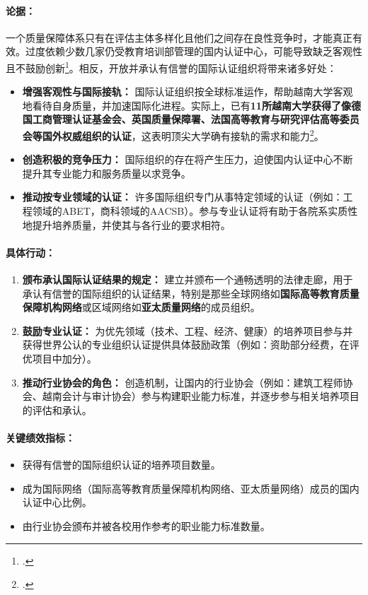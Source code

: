 \paragraph{论据：}
一个质量保障体系只有在评估主体多样化且他们之间存在良性竞争时，才能真正有效。过度依赖少数几家仍受教育培训部管理的国内认证中心，可能导致缺乏客观性且不鼓励创新\footcite{giaoducnet_kdcl_list_2023}。相反，开放并承认有信誉的国际认证组织将带来诸多好处：
\begin{itemize}
    \item \textbf{增强客观性与国际接轨：} 国际认证组织按全球标准运作，帮助越南大学客观地看待自身质量，并加速国际化进程。实际上，已有\textbf{11所越南大学获得了像德国工商管理认证基金会、英国质量保障署、法国高等教育与研究评估高等委员会等国外权威组织的认证}，这表明顶尖大学确有接轨的需求和能力\footcite{thuvienphapluat_11truong_quocte}。
    \item \textbf{创造积极的竞争压力：} 国际组织的存在将产生压力，迫使国内认证中心不断提升其专业能力和服务质量以求竞争。
    \item \textbf{推动按专业领域的认证：} 许多国际组织专门从事特定领域的认证（例如：工程领域的ABET，商科领域的AACSB）。参与专业认证将有助于各院系实质性地提升培养质量，并使其与各行业的要求相符。
\end{itemize}

\paragraph{具体行动：}
\begin{enumerate}
    \item \textbf{颁布承认国际认证结果的规定：} 建立并颁布一个通畅透明的法律走廊，用于承认有信誉的国际组织的认证结果，特别是那些全球网络如\textbf{国际高等教育质量保障机构网络}或区域网络如\textbf{亚太质量网络}的成员组织。
    \item \textbf{鼓励专业认证：} 为优先领域（技术、工程、经济、健康）的培养项目参与并获得世界公认的专业组织认证提供具体鼓励政策（例如：资助部分经费，在评优项目中加分）。
    \item \textbf{推动行业协会的角色：} 创造机制，让国内的行业协会（例如：建筑工程师协会、越南会计与审计协会）参与构建职业能力标准，并逐步参与相关培养项目的评估和承认。
\end{enumerate}

\paragraph{关键绩效指标：}
\begin{itemize}
    \item 获得有信誉的国际组织认证的培养项目数量。
    \item 成为国际网络（国际高等教育质量保障机构网络、亚太质量网络）成员的国内认证中心比例。
    \item 由行业协会颁布并被各校用作参考的职业能力标准数量。
\end{itemize}

